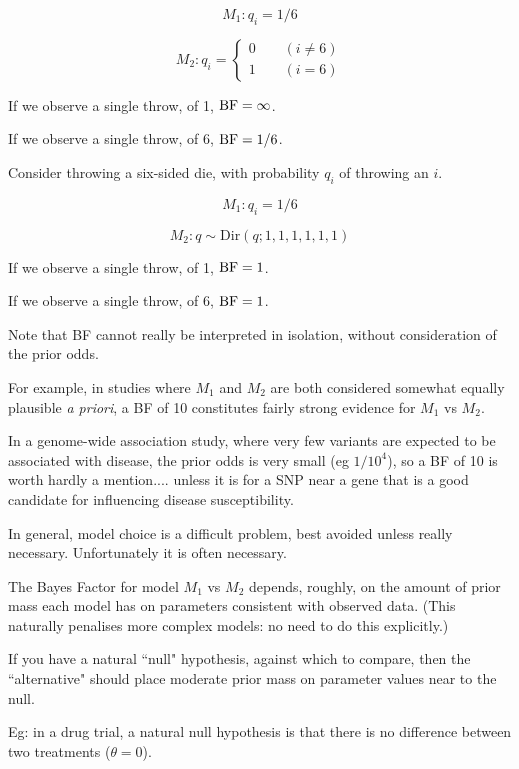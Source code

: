 $$M_1: q_i=1/6$$

$$M_2: q_i = 
\begin{cases}
0  \qquad (i \neq 6) \\
1 \qquad (i = 6)
\end{cases}
$$

If we observe a single throw, of 1, $\text{BF}= \infty$.

If we observe a single throw, of 6, $\text{BF} = 1/6$.



Consider throwing a six-sided die, with probability $q_i$ of throwing an $i$.

$$M_1: q_i=1/6$$

$$M_2: q \sim \text{Dir}(q; 1,1,1,1,1,1)$$

If we observe a single throw, of 1, $\text{BF}= 1$.

If we observe a single throw, of 6, $\text{BF} = 1$.


Note that BF cannot really be interpreted in isolation, without consideration of the
prior odds.

For example, in studies where $M_1$ and $M_2$ are both considered somewhat
equally plausible {\it a priori}, 
a BF of 10 constitutes fairly strong
evidence for $M_1$ vs $M_2$.

In a genome-wide association study, where very few variants are expected to be associated
with disease, the prior odds is very small (eg $1/10^4$), so a BF of 10 is worth
hardly a mention.... unless it is for a SNP near a gene that is a good candidate for
influencing disease susceptibility. 



In general, model choice is a difficult problem, best avoided unless
really necessary. Unfortunately it is often necessary.

The Bayes Factor for model $M_1$ vs $M_2$ depends, roughly, on 
the amount of prior mass each model has on parameters consistent with observed data.
(This naturally penalises more complex models: no need to do this explicitly.)

If you have a natural ``null" hypothesis, against which to compare, then the
``alternative" should place moderate prior mass on parameter values near to the null.

Eg: in a drug trial, a natural null hypothesis is that there is no difference between two
treatments ($\theta=0$).

